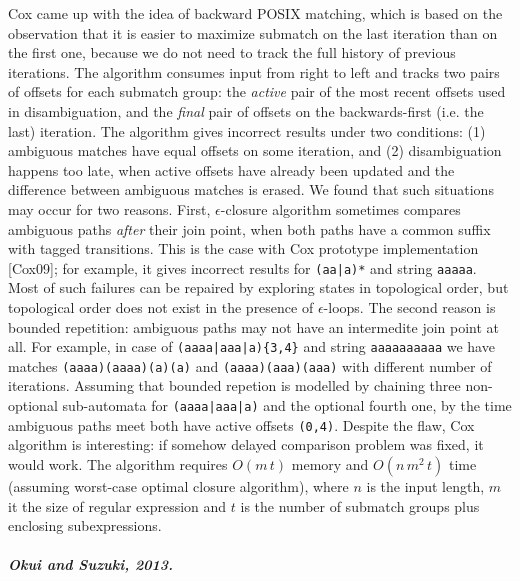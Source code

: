 \documentclass[AMA,STIX1COL]{WileyNJD-v2}
\begin{document}
Cox came up with the idea of backward POSIX matching,
which is based on the observation that it is easier to maximize submatch on the last iteration than on the first one,
because we do not need to track the full history of previous iterations.
The algorithm consumes input from right to left
and tracks two pairs of offsets for each submatch group:
the \emph{active} pair of the most recent offsets used in disambiguation,
and the \emph{final} pair of offsets on the backwards-first (i.e. the last) iteration.
The algorithm gives incorrect results under two conditions:
(1) ambiguous matches have equal offsets on some iteration,
and (2) disambiguation happens too late, when active offsets have already been updated and the difference between ambiguous matches is erased.
We found that such situations may occur for two reasons.
First, $\epsilon$-closure algorithm sometimes compares ambiguous paths \emph{after} their join point,
when both paths have a common suffix with tagged transitions.
This is the case with Cox prototype implementation [Cox09]; for example, it gives incorrect results for \texttt{(aa|a)*} and string \texttt{aaaaa}.
Most of such failures can be repaired by exploring states in topological order,
but topological order does not exist in the presence of $\epsilon$-loops.
The second reason is bounded repetition: ambiguous paths may not have an intermedite join point at all.
For example, in case of \texttt{(aaaa|aaa|a)\{3,4\}} and string \texttt{aaaaaaaaaa}
we have matches \texttt{(aaaa)(aaaa)(a)(a)} and \texttt{(aaaa)(aaa)(aaa)}
with different number of iterations.
Assuming that bounded repetion is modelled by chaining three non-optional sub-automata for \texttt{(aaaa|aaa|a)} and the optional fourth one,
by the time ambiguous paths meet both have active offsets \texttt{(0,4)}.
Despite the flaw, Cox algorithm is interesting: if somehow delayed comparison problem was fixed, it would work.
The algorithm requires $O(m \, t)$ memory and $O(n \, m^2 \, t)$ time
(assuming worst-case optimal closure algorithm),
where $n$ is the input length,
$m$ it the size of regular expression
and $t$ is the number of submatch groups plus enclosing subexpressions.

\subparagraph{Okui and Suzuki, 2013.}
\end{document}
